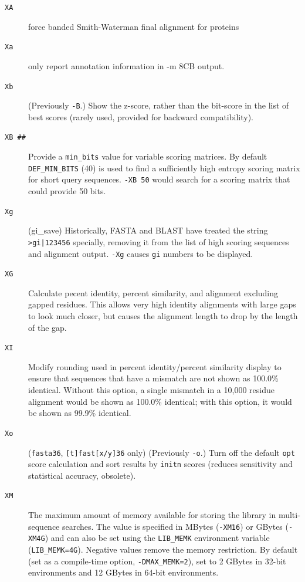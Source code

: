 \documentclass[11pt]{article}
\begin{document}
\begin{description}
\begin{description}
\item[\texttt{XA}] force banded Smith-Waterman final alignment for proteins

\item[\texttt{Xa}] only report annotation information in -m 8CB output.

\item[\texttt{Xb}] (Previously \texttt{-B}.)  Show the z-score, rather
  than the bit-score in the list of best scores (rarely used, provided
  for backward compatibility).

\item[\texttt{XB \#\#}] Provide a \texttt{min\_bits} value for variable
  scoring matrices.  By default \texttt{DEF\_MIN\_BITS} (40) is used
  to find a sufficiently high entropy scoring matrix for short query
  sequences.  \texttt{-XB 50} would search for a scoring matrix that
  could provide 50 bits.

\item[\texttt{Xg}] (gi\_save) Historically, FASTA and BLAST have
  treated the string \texttt{>gi|123456} specially, removing it from the list
  of high scoring sequences and alignment output.  \texttt{-Xg}
  causes \texttt{gi} numbers to be displayed.

\item[\texttt{XG}] Calculate pecent identity, percent similarity, and
  alignment excluding gapped residues.
  This allows very high identity alignments with large gaps to look
  much closer, but causes the alignment length to drop by the length
  of the gap.

\item[\texttt{XI}] Modify rounding used in percent identity/percent
  similarity display to ensure that sequences that have a mismatch are
  not shown as 100.0\% identical.  Without this option, a single
  mismatch in a 10,000 residue alignment would be shown as 100.0\%
  identical; with this option, it would be shown as 99.9\%
  identical.

\item[\texttt{Xo}] (\texttt{fasta36}, \texttt{[t]fast[x/y]36} only)
  (Previously \texttt{-o}.) Turn off the default \texttt{opt} score
  calculation and sort results by \texttt{initn} scores (reduces
  sensitivity and statistical accuracy, obsolete).

\item[\texttt{XM}] The maximum amount of memory available for storing
  the library in multi-sequence searches. The value is specified in
  MBytes (\texttt{-XM16}) or GBytes (\texttt{-XM4G}) and can also be
  set using the \texttt{LIB\_MEMK} environment variable
  (\texttt{LIB\_MEMK=4G}).  Negative values remove the memory
  restriction. By default (set as a compile-time option,
  \texttt{-DMAX\_MEMK=2}), set to 2 GBytes in 32-bit environments and
  12 GBytes in 64-bit environments.


\end{description}
\end{description}
\end{document}
